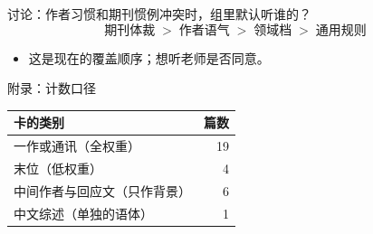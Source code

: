 \documentclass[aspectratio=169,10pt]{beamer}
\begin{document}
\begin{frame}{讨论：作者习惯和期刊惯例冲突时，组里默认听谁的？}
  \[
    \text{期刊体裁} \;>\; \text{作者语气} \;>\; \text{领域档} \;>\; \text{通用规则}
  \]
  \begin{itemize}
    \item 这是现在的覆盖顺序；想听老师是否同意。
  \end{itemize}
\end{frame}

\appendix
\begin{frame}{附录：计数口径}
  \begin{tabular}{lr}
    \toprule
    卡的类别 & 篇数 \\
    \midrule
    一作或通讯（全权重） & 19 \\
    末位（低权重） & 4 \\
    中间作者与回应文（只作背景） & 6 \\
    中文综述（单独的语体） & 1 \\
    \bottomrule
  \end{tabular}
\end{frame}
\end{document}
